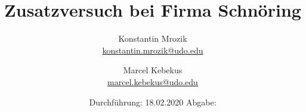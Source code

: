 

\title{Zusatzversuch bei Firma Schnöring}
\author{%
  Konstantin Mrozik\\%
  \href{mailto:konstantin.mrozik@udo.edu}{konstantin.mrozik@udo.edu}%
  \and%
  Marcel Kebekus\\%
  \href{mailto:marcel.kebekus@udo.edu}{marcel.kebekus@udo.edu}%
}
\date{%
  Durchführung: 18.02.2020
  \hspace{3em}
  Abgabe: 
}
\publishers{TU Dortmund – Fakultät Physik}
\makeatletter         
\def\@maketitle{
\raggedright
\texttt{[image: bilder/lo\_TU-Do 2008/logo\_rgb\_jpg]}\\[8ex]
\begin{center}
{\Huge \bfseries \sffamily \@title }\\[4ex] 
{\Large  \@author}\\[4ex] 
\@date\\[8ex]
\publishers\\
\end{center}}
\makeatother





\maketitle
\thispagestyle{empty}
\tableofcontents
\newpage


%
%
\nocite{*}
\printbibliography


